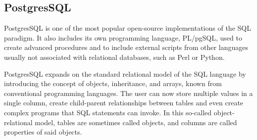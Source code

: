 \subsection{PostgresSQL}
\label{subsec:background:first_section:second_subsection}
\par PostgresSQL is one of the most popular open-source implementations of the SQL paradigm\citep{worsleyPostgresSQL}. It also includes its own programming language, PL/pgSQL, used to create advanced procedures and to include external scripts from other languages usually not associated with relational databases, such as Perl or Python. 
\par PostgresSQL expands on the standard relational model of the SQL language by introducing the concept of objects, inheritance, and arrays, known from conventional programming languages. The user can now store multiple values in a single column, create child-parent relationships between tables and even create complex programs that SQL statements can invoke. In this so-called object-relational model, tables are sometimes called objects, and columns are called properties of said objects\citep{ACID}.

